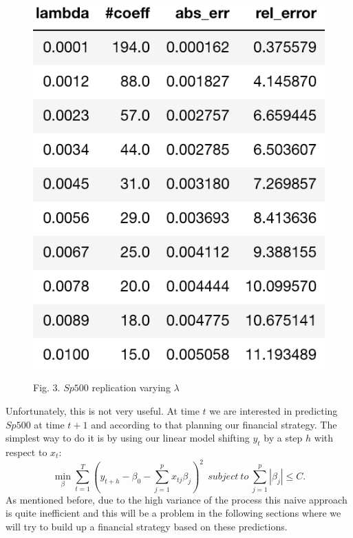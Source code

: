 \documentclass{article}%
\begin{document}
\begin{figure}[h!]
  \centering
  \includegraphics[scale=0.6]{err_lambda.png}
    
\begin{center}
\begin{small}
Fig. 3. $Sp500$ replication varying $\lambda$
\end{small}
\end{center}

  \label{err_alpha}
\end{figure}

Unfortunately, this is not very useful. At time $t$ we are interested in predicting $Sp500$ at time $t+1$ and according to that planning our financial strategy. The simplest way to do it is by using our linear model shifting $y_t$ by a step $h$ with respect to $x_t$:
\begin{equation}
 \min_{\beta} \sum_{t=1}^T ( y_{t+h} -\beta_0 -\sum_{j=1}^p x_{tj} \beta_j)^2 ~~subject~to~\sum_{j=1}^p |\beta_j| \leq C.
\end{equation}
As mentioned before, due to the high variance of the process this naive approach is quite inefficient and this will be a problem in the following sections where we will try to build up a financial strategy based on these predictions.
\end{document}
